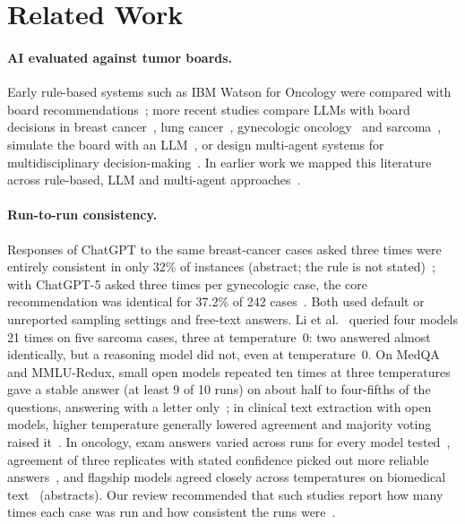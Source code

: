 \section{Related Work}\label{sec:related}

\paragraph{AI evaluated against tumor boards.} Early rule-based systems such as IBM Watson for Oncology were compared
with board recommendations~\cite{zhao2020watson}; more recent studies compare LLMs with board decisions in breast
cancer~\cite{liao2025,dindelegan2026}, lung cancer~\cite{popescu2026,zhou2026lung}, gynecologic
oncology~\cite{asoglu2026} and sarcoma~\cite{li2025imitation}, simulate the board with an LLM~\cite{stifini2026}, or
design multi-agent systems for multidisciplinary decision-making~\cite{zhang2025gi}. In earlier work we mapped this
literature across rule-based, LLM and multi-agent approaches~\cite{sharma2026review}.

\paragraph{Run-to-run consistency.} Responses of ChatGPT to the same breast-cancer cases asked three times were
entirely consistent in only 32\% of instances (abstract; the rule is not stated)~\cite{liao2025}; with ChatGPT-5 asked
three times per gynecologic case, the core recommendation was identical for 37.2\% of 242 cases~\cite{asoglu2026}.
Both used default or unreported sampling settings and free-text answers. Li et al.~\cite{li2025imitation} queried four
models 21 times on five sarcoma cases, three at temperature~0: two answered almost identically, but a reasoning model
did not, even at temperature~0. On MedQA and MMLU-Redux, small open models repeated ten times at three temperatures
gave a stable answer (at least 9 of 10 runs) on about half to four-fifths of the questions, answering with a letter
only~\cite{pinhanez2025}; in clinical text extraction with open models, higher temperature generally lowered agreement
and majority voting raised it~\cite{liu2026repro}. In oncology, exam answers varied across runs for every model
tested~\cite{bertschmann2026}, agreement of three replicates with stated confidence picked out more reliable
answers~\cite{rydzewski2024}, and flagship models agreed closely across temperatures on biomedical
text~\cite{windisch2026} (abstracts).
Our review recommended that such studies report how many times each case was run and how consistent the runs
were~\cite{sharma2026review}.

